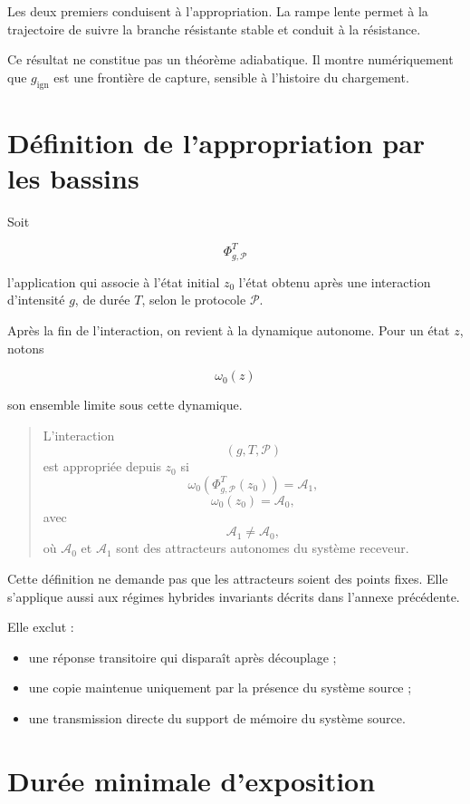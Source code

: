 Les deux premiers conduisent à l'appropriation. La rampe lente permet
à la trajectoire de suivre la branche résistante stable et conduit à
la résistance.

Ce résultat ne constitue pas un théorème adiabatique. Il montre
numériquement que \(g_{\mathrm{ign}}\) est une frontière de capture,
sensible à l'histoire du chargement.

\section{Définition de l'appropriation par les bassins}
\label{annexe-resistance-definition-appropriation}

Soit

\[
\Phi_{g,\mathcal P}^T
\]

l'application qui associe à l'état initial \(z_0\) l'état obtenu après
une interaction d'intensité \(g\), de durée \(T\), selon le protocole
\(\mathcal P\).

Après la fin de l'interaction, on revient à la dynamique autonome. Pour
un état \(z\), notons

\[
\omega_0(z)
\]

son ensemble limite sous cette dynamique.

\begin{quote}
L'interaction
\[
(g,T,\mathcal P)
\]
est appropriée depuis \(z_0\) si
\[
\omega_0
\left(
\Phi_{g,\mathcal P}^T(z_0)
\right)
=
\mathcal A_1,
\]
\[
\omega_0(z_0)
=
\mathcal A_0,
\]
avec
\[
\mathcal A_1\neq\mathcal A_0,
\]
où \(\mathcal A_0\) et \(\mathcal A_1\) sont des attracteurs autonomes
du système receveur.
\end{quote}

Cette définition ne demande pas que les attracteurs soient des points
fixes. Elle s'applique aussi aux régimes hybrides invariants décrits
dans l'annexe précédente.

Elle exclut :

\begin{itemize}
\item
  une réponse transitoire qui disparaît après découplage ;
\item
  une copie maintenue uniquement par la présence du système source ;
\item
  une transmission directe du support de mémoire du système source.
\end{itemize}

\section{Durée minimale d'exposition}
\label{annexe-resistance-duree-minimale}


